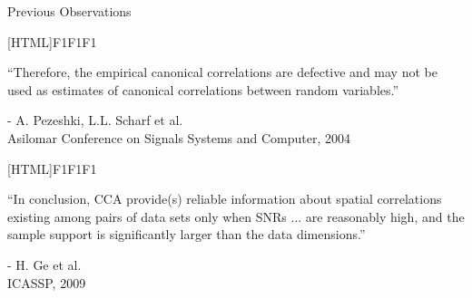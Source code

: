 \documentclass[8pt]{beamer}
\begin{document}
\begin{frame}{Previous Observations}

\centering
{}[HTML]{F1F1F1}{\parbox{0.8\textwidth}{%
    ``Therefore, the \textcolor{textred}{empirical canonical correlations are defective and
      may not be used} as     estimates of canonical correlations between random
    variables.''
    \begin{flushright}- A. Pezeshki,     L.L. Scharf et al. \\Asilomar Conference on
      Signals Systems and Computer, 2004\end{flushright}

      }}

\vspace{4ex}

[HTML]{F1F1F1}{\parbox{0.8\textwidth}{%
    ``In conclusion, CCA provide(s) \textcolor{textred}{reliable information} about spatial
    correlations existing among pairs of data sets \textcolor{textred}{only when SNRs ... are
    reasonably high, and the sample support is significantly larger than the data
    dimensions.}''
  \begin{flushright} - H. Ge et al. \\ICASSP, 2009 \end{flushright}}}

\end{frame}
\end{document}
